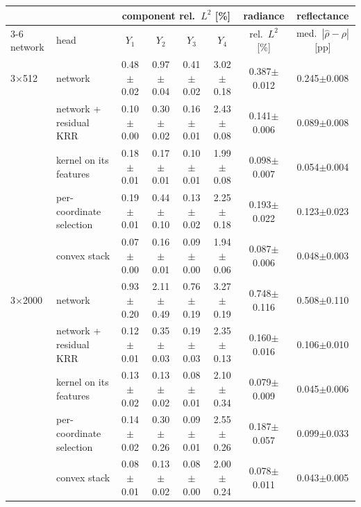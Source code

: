\begin{tabular}{llcccccc}
\toprule
 & & \multicolumn{4}{c}{component rel.\ $L^2$ [\%]} & radiance & reflectance \\
\cmidrule(lr){3-6}
network & head & $Y_1$ & $Y_2$ & $Y_3$ & $Y_4$ & rel.\ $L^2$ [\%] & med.\ $|\hat\rho-\rho|$ [pp] \\
\midrule
3$\times$512 & network & 0.48$\pm$0.02 & 0.97$\pm$0.04 & 0.41$\pm$0.02 & 3.02$\pm$0.18 & 0.387$\pm$0.012 & 0.245$\pm$0.008 \\
 & network + residual KRR & 0.10$\pm$0.00 & 0.30$\pm$0.02 & 0.16$\pm$0.01 & 2.43$\pm$0.08 & 0.141$\pm$0.006 & 0.089$\pm$0.008 \\
 & kernel on its features & 0.18$\pm$0.01 & 0.17$\pm$0.01 & 0.10$\pm$0.01 & 1.99$\pm$0.08 & 0.098$\pm$0.007 & 0.054$\pm$0.004 \\
 & per-coordinate selection & 0.19$\pm$0.01 & 0.44$\pm$0.10 & 0.13$\pm$0.02 & 2.25$\pm$0.18 & 0.193$\pm$0.022 & 0.123$\pm$0.023 \\
 & convex stack & 0.07$\pm$0.00 & 0.16$\pm$0.01 & 0.09$\pm$0.00 & 1.94$\pm$0.06 & 0.087$\pm$0.006 & 0.048$\pm$0.003 \\
\midrule
3$\times$2000 & network & 0.93$\pm$0.20 & 2.11$\pm$0.49 & 0.76$\pm$0.19 & 3.27$\pm$0.19 & 0.748$\pm$0.116 & 0.508$\pm$0.110 \\
 & network + residual KRR & 0.12$\pm$0.01 & 0.35$\pm$0.03 & 0.19$\pm$0.03 & 2.35$\pm$0.13 & 0.160$\pm$0.016 & 0.106$\pm$0.010 \\
 & kernel on its features & 0.13$\pm$0.02 & 0.13$\pm$0.02 & 0.08$\pm$0.01 & 2.10$\pm$0.34 & 0.079$\pm$0.009 & 0.045$\pm$0.006 \\
 & per-coordinate selection & 0.14$\pm$0.02 & 0.30$\pm$0.26 & 0.09$\pm$0.01 & 2.55$\pm$0.26 & 0.187$\pm$0.057 & 0.099$\pm$0.033 \\
 & convex stack & 0.08$\pm$0.01 & 0.13$\pm$0.02 & 0.08$\pm$0.00 & 2.00$\pm$0.24 & 0.078$\pm$0.011 & 0.043$\pm$0.005 \\
\bottomrule
\end{tabular}
